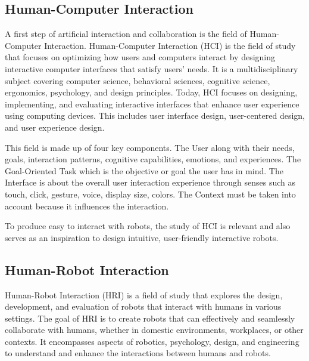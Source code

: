 \subsection{Human-Computer Interaction}

A first step of artificial interaction and collaboration is the field of Human-Computer Interaction. Human-Computer Interaction (HCI) is the field of study that focuses on optimizing how users and computers interact by designing interactive computer interfaces that satisfy users' needs. It is a multidisciplinary subject covering computer science, behavioral sciences, cognitive science, ergonomics, psychology, and design principles.
Today, HCI focuses on designing, implementing, and evaluating interactive interfaces that enhance user experience using computing devices. This includes user interface design, user-centered design, and user experience design. 

This field is made up of four key components. 
The User along with their needs, goals, interaction patterns, cognitive capabilities, emotions, and experiences.
The Goal-Oriented Task which is the objective or goal the user has in mind.
The Interface is about the overall user interaction experience through senses such as touch, click, gesture, voice, display size, colors.
The Context must be taken into account because it influences the interaction. 

To produce easy to interact with robots, the study of HCI is relevant and also serves as an inspiration to design intuitive, user-friendly interactive robots.

\subsection{Human-Robot Interaction}

Human-Robot Interaction (HRI) is a field of study that explores the design, development, and evaluation of robots that interact with humans in various settings. The goal of HRI is to create robots that can effectively and seamlessly collaborate with humans, whether in domestic environments, workplaces, or other contexts. It encompasses aspects of robotics, psychology, design, and engineering to understand and enhance the interactions between humans and robots.

